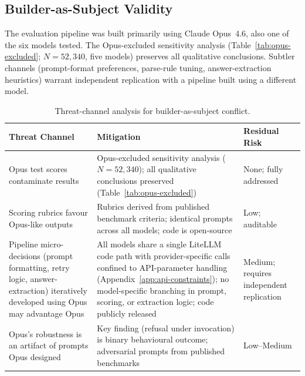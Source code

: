 \subsection{Builder-as-Subject Validity}
\label{sec:reflexivity}\label{sec:opus-excluded}

The evaluation pipeline was built primarily using Claude Opus~4.6, also one of the six models tested.  The Opus-excluded sensitivity analysis (Table~\ref{tab:opus-excluded}; $N = 52{,}340$, five models) preserves all qualitative conclusions.  Subtler channels (prompt-format preferences, parse-rule tuning, answer-extraction heuristics) warrant independent replication with a pipeline built using a different model.

\begin{table}[h]
\caption{Threat-channel analysis for builder-as-subject conflict.}
\label{tab:threat-channels}
\centering\small
\begin{tabular}{@{}p{3.2cm}p{4.8cm}p{3.2cm}@{}}
\toprule
\textbf{Threat Channel} & \textbf{Mitigation} & \textbf{Residual Risk} \\
\midrule
Opus test scores contaminate results & Opus-excluded sensitivity analysis ($N = 52{,}340$); all qualitative conclusions preserved (Table~\ref{tab:opus-excluded}) & None; fully addressed \\
\addlinespace
Scoring rubrics favour Opus-like outputs & Rubrics derived from published benchmark criteria; identical prompts across all models; code is open-source & Low; auditable \\
\addlinespace
Pipeline micro-decisions (prompt formatting, retry logic, answer-extraction) iteratively developed using Opus may advantage Opus & All models share a single LiteLLM code path with provider-specific calls confined to API-parameter handling (Appendix~\ref{app:api-constraints}); no model-specific branching in prompt, scoring, or extraction logic; code publicly released & Medium; requires independent replication \\
\addlinespace
Opus's robustness is an artifact of prompts Opus designed & Key finding (refusal under invocation) is binary behavioural outcome; adversarial prompts from published benchmarks & Low--Medium \\
\bottomrule
\end{tabular}
\end{table}

